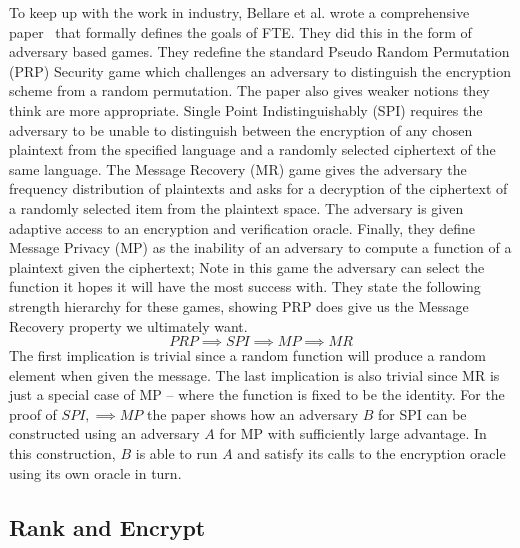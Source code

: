 \documentclass[ %
                    author={Samuel Russell},
                supervisor={Prof. Bogdan Warinschi},
                    degree={MEng},
                     title={Innocuous Ciphertexts},
                  subtitle={The DE-CENSOR Scheme},
                      type={Research},
                      year={2018} ]{dissertation}
\begin{document}
To keep up with the work in industry, Bellare et al. wrote a comprehensive paper~\cite{fpe} that formally defines the goals of FTE. They did this in the form of adversary based games. They redefine the standard Pseudo Random Permutation (PRP) Security game which challenges an adversary to distinguish the encryption scheme from a random permutation. The paper also gives weaker notions they think are more appropriate. Single Point Indistinguishably (SPI) requires the adversary to be unable to distinguish between the encryption of any chosen plaintext from the specified language and a randomly selected ciphertext of the same language. The Message Recovery (MR) game gives the adversary the frequency distribution of plaintexts and asks for a decryption of the ciphertext of a randomly selected item from the plaintext space. The adversary is given adaptive access to an encryption and verification oracle. Finally, they define Message Privacy (MP) as the inability of an adversary to compute a function of a plaintext given the ciphertext; Note in this game the adversary can select the function it hopes it will have the most success with. They state the following strength hierarchy for these games, showing PRP does give us the Message Recovery property we ultimately want.
$$ PRP \implies SPI \implies MP \implies MR $$
The first implication is trivial since a random function will produce a random element when given the message. The last implication is also trivial since MR is just a special case of MP -- where the function is fixed to be the identity. For the proof of $ SPI, \implies MP $ the paper shows how an adversary $B$ for SPI can be constructed using an adversary $A$ for MP with sufficiently large advantage. In this construction, $B$ is able to run $A$ and satisfy its calls to the encryption oracle using its own oracle in turn.

\subsection{Rank and Encrypt}
\end{document}
